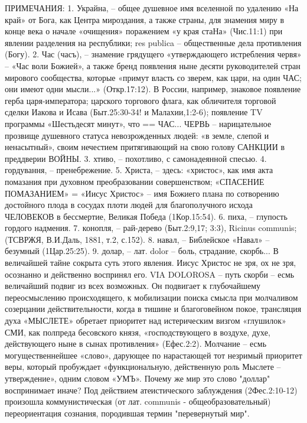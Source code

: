 ПРИМЕЧАНИЯ:
1. Украйна, – общее душевное имя вселенной по удалению «На край» от Бога, как Центра мироздания, а также страны, для знамения миру в конце века о начале «очищения» поражением «у края стаНа» (Чис.11:1) при явлении разделения на республики;  res  publica – общественные дела противления (Богу).
2. Час (часъ), – знамение грядущего «утверждающего истребления червя» – «Час воли Божией», а также бренд появления ныне десяти руководителей стран мирового сообщества, которые «примут власть со зверем, как цари, на один ЧАС; они имеют одни мысли...» (Откр.17:12). В России, например, знаковое появление герба царя-императора; царского торгового флага, как обличителя торговой сделки Иакова и Исава (Быт.25:30-34! и Малахии,1:2-6); появление TV программы «Шестьдесят минут», что == ЧАС...
         ЧЕРВЬ – нарицательное прозвище душевного статуса невозрожденных людей: «в земле, слепой и ненасытный», своим нечестием притягивающий на свою голову САНКЦИИ в преддверии ВОЙНЫ.
3. хтиво, – похотливо, с самонадеянной спесью.
4. гордування, – пренебрежение.
5. Христа, – здесь: «христос», как имя акта помазания при духовном преобразовании совершенством;
    «СПАСЕНИЕ ПОМАЗАНИЕМ» = «Иисус Христос» – имя Божиего плана по сотворению достойного плода в сосудах плоти людей для благополучного исхода  ЧЕЛОВЕКОВ в бессмертие, Великая Победа (1Кор.15:54).
6. пиха, – глупость гордого надмения.
7. конопля, – рай-дерево (Быт.2:9,17; 3:3), Ricinus communis; (ТСВРЖЯ, В.И.Даль, 1881, т.2, с.152).
8. навал, – Библейское «Навал» – безумный (1Цар.25:25).
9. долар, – лат. dolor – боль, страдание, скорбь... В величайшей тайне сокрыта суть этого явления. Иисус Христос не зря, ох не зря, осознанно и действенно воспринял его.  VIA DOLOROSA – путь скорби – есмь величайший подвиг из всех возможных. Он подвигает к глубочайшему переосмыслению происходящего, к мобилизации поиска смысла при молчаливом созерцании действительности, когда в тишине и благоговейном покое, трансляция духа «МЫСЛЕТЕ» обретает приоритет над истерическим визгом «глушилок» СМИ, как полпреда бесовского князя, «господствующего в воздухе, духе, действующего ныне в сынах противления» (Ефес.2:2).
    Молчание – есмь могущественнейшее «слово», дарующее по нарастающей тот незримый приоритет веры, который пробуждает «функциональную, действенную роль Мыслете – утверждение», одним словом «УМЪ».
    Почему же мир это слово "доллар" воспринимает иначе? Под действием атеистического заблуждения (2Фес.2:10-12) произошла коммунистическая (от лат. communis - общеобразовательный) переориентация сознания, породившая термин "перевернутый мир".

